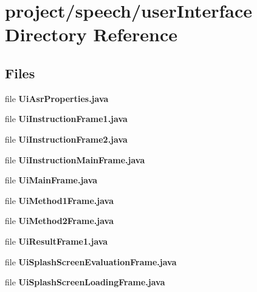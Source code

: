 \section{project/speech/user\+Interface Directory Reference}
\label{dir_0283843da58f612939ec43bb707c15e6}
\subsection*{Files}
\begin{DoxyCompactItemize}
\item 
file {\bf Ui\+Asr\+Properties.\+java}
\item 
file {\bf Ui\+Instruction\+Frame1.\+java}
\item 
file {\bf Ui\+Instruction\+Frame2.\+java}
\item 
file {\bf Ui\+Instruction\+Main\+Frame.\+java}
\item 
file {\bf Ui\+Main\+Frame.\+java}
\item 
file {\bf Ui\+Method1\+Frame.\+java}
\item 
file {\bf Ui\+Method2\+Frame.\+java}
\item 
file {\bf Ui\+Result\+Frame1.\+java}
\item 
file {\bf Ui\+Splash\+Screen\+Evaluation\+Frame.\+java}
\item 
file {\bf Ui\+Splash\+Screen\+Loading\+Frame.\+java}
\end{DoxyCompactItemize}
